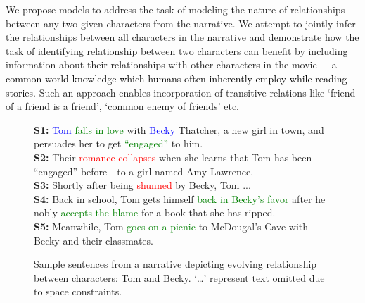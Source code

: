 \documentclass[9.8pt, twocolumn]{article}
\begin{document}
We propose models to address the task of modeling the nature of relationships between any two given characters from the narrative. We attempt to jointly infer the relationships between all characters in the narrative and demonstrate how the task of identifying relationship between two characters can benefit by including information about their relationships with other characters in the movie~\cite{rel2} \textcolor{black}{- a common world-knowledge which humans often inherently employ while reading stories}. Such an approach enables incorporation of transitive relations like `friend of a friend is a friend', `common enemy of friends' etc.

\begin{figure}[tb]
\footnotesize{
\textbf{S1:} \textcolor{blue}{Tom} \textcolor{Green}{falls in love} with \textcolor{blue}{Becky} Thatcher, a new girl in town, and persuades her to get \textcolor{Green}{``engaged''} to him. \\
\textbf{S2:} Their \textcolor{red}{romance collapses} when she learns that Tom has been ``engaged'' before—to a girl named Amy Lawrence. \\
\textbf{S3:} Shortly after being \textcolor{red}{shunned} by Becky, Tom ...\\
\textbf{S4:} Back in school, Tom gets himself \textcolor{Green}{back in Becky’s favor} after he nobly \textcolor{Green}{accepts the blame} for a book that she has ripped. \\
\textbf{S5:} Meanwhile, Tom \textcolor{Green}{goes on a picnic} to McDougal’s Cave with Becky and their classmates.
}
\caption{Sample sentences from a narrative depicting evolving relationship between characters: Tom and Becky. `\ldots' represent text omitted due to space constraints.}
\label{fig:introEg}
\end{figure}
\end{document}
